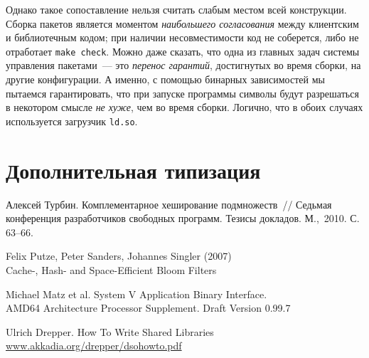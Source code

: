\documentclass[russian,a4paper,12pt]{article}
\begin{document}
Однако такое сопоставление нельзя считать слабым местом всей конструкции.  Сборка
пакетов является моментом \textit{наибольшего согласования} между клиентским и библиотечным
кодом; при наличии несовместимости код не соберется, либо не отработает \texttt{make check}.
Можно даже сказать, что одна из главных задач системы управления пакетами~--- это
\emph{перенос гарантий}, достигнутых во время сборки, на другие конфигурации.
А именно, с помощью бинарных зависимостей мы пытаемся гарантировать, что
при запуске программы символы будут разрешаться в некотором смысле
\emph{не хуже}, чем во время сборки.  Логично, что в обоих случаях используется
загрузчик \verb|ld.so|.
\begin{comment}
Вообще само понятие бинарной совместимости следовало бы определить прежде всего
исходя из этих терминов.  Если так подумать, то никакой другой бинарной совместимости
просто больше и нету.  Ну если не брать совсем какие-нибудь высоколобые определения
про семантику и т.п.  А если брать попроще, то вот сразу после сборки программа
у нас работала.  И мы пытаемся "удержать" вокруг этой программы какие-то свойства
сборочной среды, чтобы она и дальше работала.  А если программа перестает работать,
то значит все, совместимость удержать не удалось, упустили мы бабу, то есть жарптицу
всмысле.  Птицу счастья завтрашнего дня.  Сегодня программа работает, а завтра она глючит.
Поль Мориа, любовь ушла.
\end{comment}

\section{Дополнительная типизация}

\begin{thebibliography}{9}

Алексей Турбин.  Комплементарное хеширование подмножеств~//
Седьмая конференция разработчиков свободных программ.
Тезисы докладов. М.,~2010. С.\,63--66.

Felix Putze, Peter Sanders, Johannes Singler (2007)\\
Cache-, Hash- and Space-Efficient Bloom Filters

Michael Matz et al.  System V Application Binary Interface.\\
AMD64 Architecture Processor Supplement.  Draft Version 0.99.7

Ulrich Drepper. How To Write Shared Libraries\\
\url{www.akkadia.org/drepper/dsohowto.pdf}

\end{thebibliography}
\end{document}
